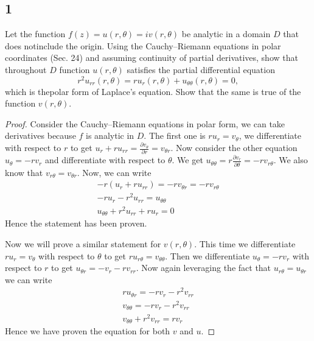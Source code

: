 \documentclass{article}
\newcommand{\partiald}[2]{\frac{\partial #1}{\partial #2}}
\begin{document}
    \subsection*{1}
    Let  the  function $f(z) = u(r,\theta) = iv(r, \theta)$ be  analytic  in  
    a  domain $D$ that  does  notinclude the origin. Using the Cauchy–Riemann equations 
    in polar coordinates (Sec. 24) and assuming continuity of partial derivatives, 
    show that throughout $D$ function $u(r,\theta)$ satisfies the partial 
    differential equation $$r^2u_{rr}(r,\theta) = ru_r(r,\theta) + u_{\theta\theta}(r,\theta) = 0,$$
    which is thepolar form of Laplace’s equation. Show that the same is true of 
    the function $v(r, \theta)$.
    \begin{proof}
        Consider the Cauchy–Riemann equations in polar form, we can take derivatives
        because $f$ is analytic in $D$. The first one is
        $ru_r = v_\theta$, we differentiate with respect to $r$ to get
        $u_r + ru_{rr} = \partiald{v_\theta}{r} = v_{\theta r}$. Now consider the
        other equation $u_\theta = -rv_r$ and differentiate with respect to $\theta$.
        We get $u_{\theta\theta} = r\partiald{v_r}{\theta} = -rv_{r\theta}$. We 
        also know that $v_{r\theta} = v_{\theta r}$. Now, we can write
        \begin{gather*}
            -r(u_r + ru_{rr}) = -rv_{\theta r} = -rv_{r\theta} \\
            -ru_r - r^2u_{rr} = u_{\theta\theta} \\
            u_{\theta\theta} + r^2u_{rr} + ru_r = 0
        \end{gather*}
        Hence the statement has been proven.

        \vspace{0.25cm}
        Now we will prove a similar statement for $v(r,\theta)$. This time we
        differentiate $ru_r = v_\theta$ with respect to $\theta$ to get
        $ru_{r\theta} = v_{\theta\theta}$. Then we differentiate $u_\theta = -rv_r$
        with respect to $r$ to get $u_{\theta r} = -v_r - rv_{rr}$. Now 
        again leveraging the fact that $u_{r\theta} = u_{\theta r}$ we can write
        \begin{gather*}
            ru_{\theta r} = -rv_r - r^2v_{rr} \\
            v_{\theta \theta} = -rv_r - r^2v_{rr} \\
            v_{\theta\theta} +r^2v_{rr} = rv_r
        \end{gather*}
        Hence we have proven the equation for both $v$ and $u$.
    \end{proof}
\end{document}
